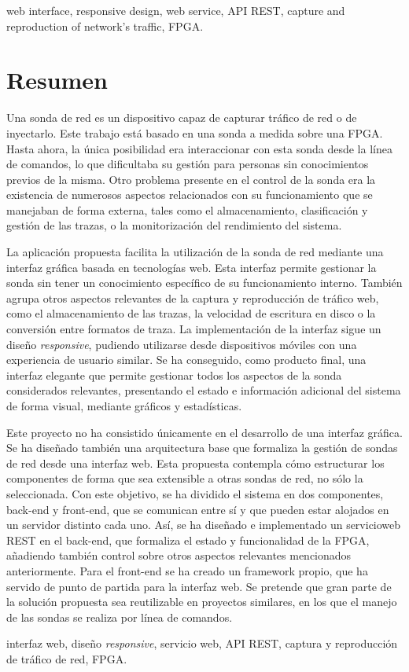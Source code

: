 \begin{keywordsEn}
web interface, responsive design, web service, \gls{API} \gls{REST}, capture and reproduction of network's traffic, \gls{FPGA}.
\end{keywordsEn}

\chapter*{Resumen}

\begin{abstractEs}

Una sonda de red es un dispositivo capaz de capturar tráfico de red o de inyectarlo.
Este trabajo está basado en una sonda a medida sobre una \gls{FPGA}.
Hasta ahora, la única posibilidad era interaccionar con esta sonda desde la línea de comandos, lo que dificultaba su gestión para personas sin conocimientos previos de la misma.
Otro problema presente en el control de la sonda era la existencia de numerosos aspectos relacionados con su funcionamiento que se manejaban de forma externa, tales como el almacenamiento, clasificación y gestión de las \glspl{traza}, o la monitorización del rendimiento del sistema.

La aplicación propuesta facilita la utilización de la sonda de red mediante una interfaz gráfica basada en tecnologías web.
Esta interfaz permite gestionar la sonda sin tener un conocimiento específico de su funcionamiento interno.
También agrupa otros aspectos relevantes de la captura y reproducción de tráfico web, como el almacenamiento de las \glspl{traza}, la velocidad de escritura en disco o la conversión entre formatos de \gls{traza}.
La implementación de la interfaz sigue un diseño \textit{responsive}, pudiendo utilizarse desde dispositivos móviles con una experiencia de usuario similar.
Se ha conseguido, como producto final, una interfaz elegante que permite gestionar todos los aspectos de la sonda considerados relevantes, presentando el estado e información adicional del sistema de forma visual, mediante gráficos y estadísticas.

Este proyecto no ha consistido únicamente en el desarrollo de una interfaz gráfica.
Se ha diseñado también una arquitectura base que formaliza la gestión de sondas de red desde una interfaz web.
Esta propuesta contempla cómo estructurar los componentes de forma que sea extensible a otras sondas de red, no sólo la seleccionada.
Con este objetivo, se ha dividido el sistema en dos componentes, \gls{back-end} y \gls{front-end}, que se comunican entre sí y que pueden estar alojados en un servidor distinto cada uno.
Así, se ha diseñado e implementado un \gls{servicioweb} \gls{REST} en el \gls{back-end}, que formaliza el estado y funcionalidad de la \gls{FPGA}, añadiendo también control sobre otros aspectos relevantes mencionados anteriormente.
Para el \gls{front-end} se ha creado un \gls{framework} propio, que ha servido de punto de partida para la interfaz web.
Se pretende que gran parte de la solución propuesta sea reutilizable en proyectos similares, en los que el manejo de las sondas se realiza por línea de comandos.

\end{abstractEs}

\begin{keywordsEs}
interfaz web, diseño \textit{responsive}, servicio web, \gls{API} \gls{REST}, captura y reproducción de tráfico de red, \gls{FPGA}.
\end{keywordsEs}
